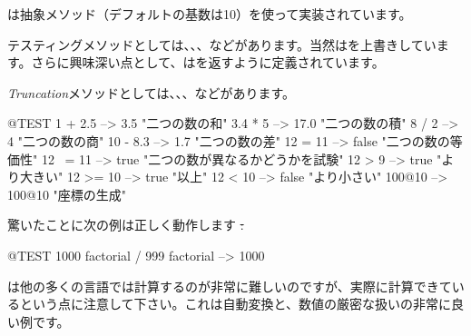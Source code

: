 \documentclass[a4paper,10pt,twoside]{book}
\begin{document}
は抽象メソッド（デフォルトの基数は10）を使って実装されています。

テスティングメソッドとしては、、、などがあります。当然はを上書きしています。さらに興味深い点として、はを返すように定義されています。

\emph{Truncation}メソッドとしては、、、などがあります。

\begin{code}{@TEST}
1 + 2.5     --> 3.5             "二つの数の和"
3.4 * 5      --> 17.0           "二つの数の積"
8 / 2         --> 4                 "二つの数の商"
10 - 8.3   --> 1.7              "二つの数の差"
12 = 11    --> false           "二つの数の等価性"
12 ~= 11 --> true            "二つの数が異なるかどうかを試験"
12 > 9      --> true            "より大きい"
12 >= 10  --> true            "以上"
12 < 10    --> false           "より小さい"
100@10   --> 100@10    "座標の生成"
\end{code}

驚いたことに次の例は正しく動作します \st:
\begin{code}{@TEST}
1000 factorial / 999 factorial --> 1000
\end{code}
は他の多くの言語では計算するのが非常に難しいのですが、実際に計算できているという点に注意して下さい。これは自動変換と、数値の厳密な扱いの非常に良い例です。
\end{document}

